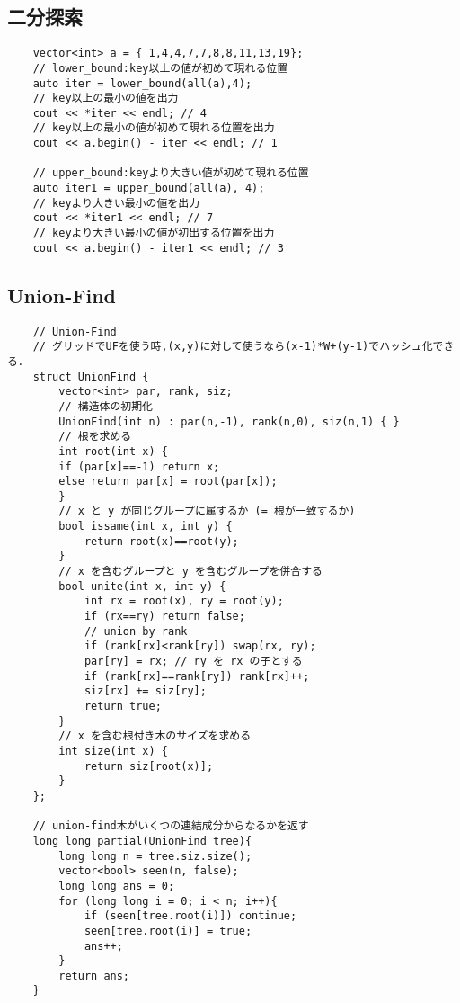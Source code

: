 \documentclass[a4paper, landscape, 9pt]{jarticle} %
\begin{document}
\begin{multicols*}{3}
    
    \subsection{二分探索}
    \begin{lstlisting}
    vector<int> a = { 1,4,4,7,7,8,8,11,13,19};
    // lower_bound:key以上の値が初めて現れる位置
    auto iter = lower_bound(all(a),4);
    // key以上の最小の値を出力
    cout << *iter << endl; // 4
    // key以上の最小の値が初めて現れる位置を出力
    cout << a.begin() - iter << endl; // 1

    // upper_bound:keyより大きい値が初めて現れる位置
    auto iter1 = upper_bound(all(a), 4);
    // keyより大きい最小の値を出力
    cout << *iter1 << endl; // 7
    // keyより大きい最小の値が初出する位置を出力
    cout << a.begin() - iter1 << endl; // 3

    \end{lstlisting}

    \subsection{Union-Find}
    \begin{lstlisting}
    // Union-Find
    // グリッドでUFを使う時,(x,y)に対して使うなら(x-1)*W+(y-1)でハッシュ化できる．
    struct UnionFind {
        vector<int> par, rank, siz;
        // 構造体の初期化
        UnionFind(int n) : par(n,-1), rank(n,0), siz(n,1) { }
        // 根を求める
        int root(int x) {
        if (par[x]==-1) return x;
        else return par[x] = root(par[x]);
        }
        // x と y が同じグループに属するか (= 根が一致するか)
        bool issame(int x, int y) {
            return root(x)==root(y);
        }
        // x を含むグループと y を含むグループを併合する
        bool unite(int x, int y) {
            int rx = root(x), ry = root(y);
            if (rx==ry) return false;
            // union by rank
            if (rank[rx]<rank[ry]) swap(rx, ry);
            par[ry] = rx; // ry を rx の子とする
            if (rank[rx]==rank[ry]) rank[rx]++;
            siz[rx] += siz[ry];
            return true;
        }
        // x を含む根付き木のサイズを求める
        int size(int x) {
            return siz[root(x)];
        }
    };
    
    // union-find木がいくつの連結成分からなるかを返す
    long long partial(UnionFind tree){
        long long n = tree.siz.size();
        vector<bool> seen(n, false);
        long long ans = 0;
        for (long long i = 0; i < n; i++){
            if (seen[tree.root(i)]) continue;
            seen[tree.root(i)] = true;
            ans++;
        }
        return ans;
    }
    

\end{lstlisting}
\end{multicols*}
\end{document}
